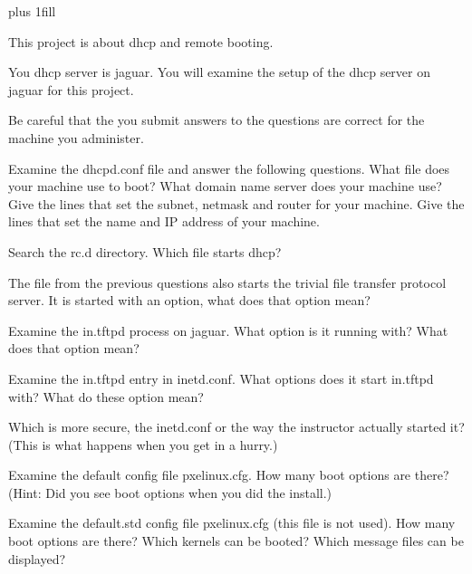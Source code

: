 
\rightskip=0pt plus 1fill

\parindent 0pt

This project is about dhcp and remote booting.

You dhcp server is jaguar.
You will examine the setup of the dhcp server on jaguar for this project.

Be careful that the you submit answers to the questions are correct
for the machine you administer.

Examine the {\ltt{}dhcpd.conf} file and answer the following questions.
What file does your machine use to boot?
What domain name server does your machine use?
Give the lines that set the subnet, netmask and router for
your machine.
Give the lines that set the name and IP address of your machine.

Search the {\ltt{}rc.d} directory. 
Which file starts {\ltt{}dhcp}?

The file from the previous questions also starts the trivial file
transfer protocol server.
It is started with an option, what does that option mean?

Examine the {\ltt{}in.tftpd} process on jaguar.
What option is it running with?
What does that option mean?

Examine the {\ltt{}in.tftpd} entry in {\ltt{}inetd.conf}.
What options does it start {\ltt{}in.tftpd} with?
What do these option mean?

Which is more secure, the {\ltt{}inetd.conf} or the way
the instructor actually started it?
(This is what happens when you get in a hurry.)

Examine the {\ltt{}default} config file {\ltt{}pxelinux.cfg}.
How many boot options are there?
(Hint: Did you see boot options when you did the install.)

Examine the {\ltt{}default.std} config file {\ltt{}pxelinux.cfg}
(this file is not used).
How many boot options are there?
Which kernels can be booted?
Which message files can be displayed?
\bye
